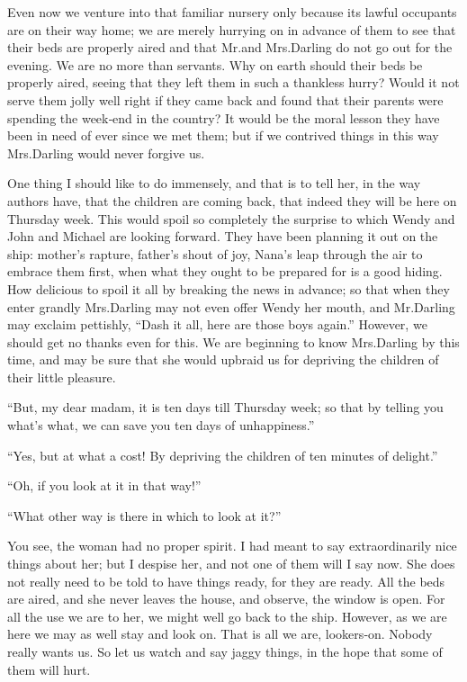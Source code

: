 Even now we venture into that familiar nursery only because its lawful occupants are on their way home;
we are merely hurrying on in advance of them
to see that their beds are properly aired and that Mr.\@ and Mrs.\@ Darling do not go out for the evening.
We are no more than servants.
Why on earth should their beds be properly aired,
seeing that they left them in such a thankless hurry?
Would it not serve them jolly well right if they came back
and found that their parents were spending the week‐end in the country?
It would be the moral lesson they have been in need of ever since we met them;
but if we contrived things in this way Mrs.\@ Darling would never forgive us.

One thing I should like to do immensely,
and that is to tell her, in the way authors have, that the children are coming back,
that indeed they will be here on Thursday week.
This would spoil so completely the surprise to which Wendy and John and Michael are looking forward.
They have been planning it out on the ship:
mother’s rapture, father’s shout of joy, Nana’s leap through the air to embrace them first,
when what they ought to be prepared for is a good hiding.
How delicious to spoil it all by breaking the news in advance;
so that when they enter grandly Mrs.\@ Darling may not even offer Wendy her mouth,
and Mr.\@ Darling may exclaim pettishly, “Dash it all, here are those boys again.”
However, we should get no thanks even for this.
We are beginning to know Mrs.\@ Darling by this time,
and may be sure that she would upbraid us for depriving the children of their little pleasure.

“But, my dear madam, it is ten days till Thursday week;
so that by telling you what’s what, we can save you ten days of unhappiness.”

“Yes, but at what a cost!
By depriving the children of ten minutes of delight.”

“Oh, if you look at it in that way!”

“What other way is there in which to look at it?”

You see, the woman had no proper spirit.
I had meant to say extraordinarily nice things about her;
but I despise her, and not one of them will I say now.
She does not really need to be told to have things ready, for they are ready.
All the beds are aired, and she never leaves the house, and observe, the window is open.
For all the use we are to her, we might well go back to the ship.
However, as we are here we may as well stay and look on.
That is all we are, lookers‐on.
Nobody really wants us.
So let us watch and say jaggy things, in the hope that some of them will hurt.

